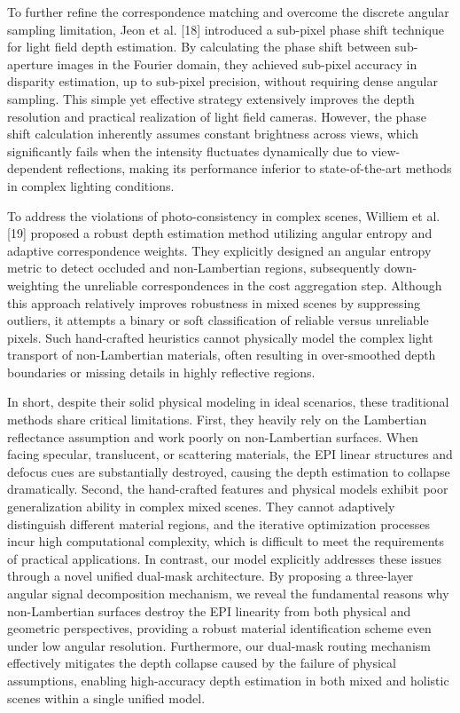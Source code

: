 To further refine the correspondence matching and overcome the discrete angular sampling limitation, Jeon et al. [18] introduced a sub-pixel phase shift technique for light field depth estimation. By calculating the phase shift between sub-aperture images in the Fourier domain, they achieved sub-pixel accuracy in disparity estimation, up to sub-pixel precision, without requiring dense angular sampling. This simple yet effective strategy extensively improves the depth resolution and practical realization of light field cameras. However, the phase shift calculation inherently assumes constant brightness across views, which significantly fails when the intensity fluctuates dynamically due to view-dependent reflections, making its performance inferior to state-of-the-art methods in complex lighting conditions.

To address the violations of photo-consistency in complex scenes, Williem et al. [19] proposed a robust depth estimation method utilizing angular entropy and adaptive correspondence weights. They explicitly designed an angular entropy metric to detect occluded and non-Lambertian regions, subsequently down-weighting the unreliable correspondences in the cost aggregation step. Although this approach relatively improves robustness in mixed scenes by suppressing outliers, it attempts a binary or soft classification of reliable versus unreliable pixels. Such hand-crafted heuristics cannot physically model the complex light transport of non-Lambertian materials, often resulting in over-smoothed depth boundaries or missing details in highly reflective regions.

In short, despite their solid physical modeling in ideal scenarios, these traditional methods share critical limitations. First, they heavily rely on the Lambertian reflectance assumption and work poorly on non-Lambertian surfaces. When facing specular, translucent, or scattering materials, the EPI linear structures and defocus cues are substantially destroyed, causing the depth estimation to collapse dramatically. Second, the hand-crafted features and physical models exhibit poor generalization ability in complex mixed scenes. They cannot adaptively distinguish different material regions, and the iterative optimization processes incur high computational complexity, which is difficult to meet the requirements of practical applications. In contrast, our model explicitly addresses these issues through a novel unified dual-mask architecture. By proposing a three-layer angular signal decomposition mechanism, we reveal the fundamental reasons why non-Lambertian surfaces destroy the EPI linearity from both physical and geometric perspectives, providing a robust material identification scheme even under low angular resolution. Furthermore, our dual-mask routing mechanism effectively mitigates the depth collapse caused by the failure of physical assumptions, enabling high-accuracy depth estimation in both mixed and holistic scenes within a single unified model.

